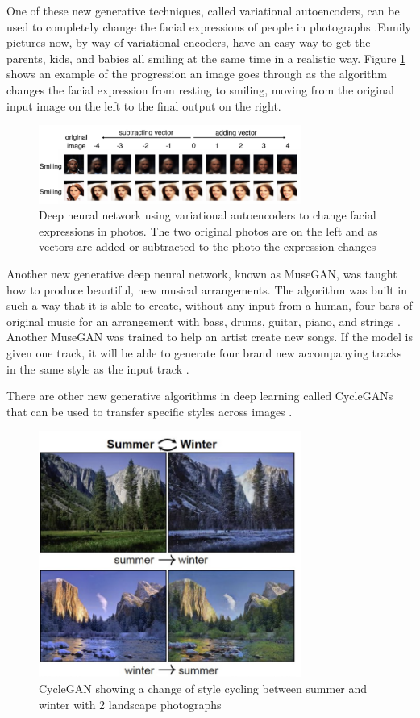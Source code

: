 \documentclass[5p,authoryear]{elsarticle}
\begin{document}
One of these new generative techniques, called variational autoencoders, can be used to completely change the facial expressions of people in photographs  \citep{VAEs}.Family pictures now, by way of variational encoders, have an easy way to get the parents, kids, and babies all smiling at the same time in a realistic way. Figure \ref{smile} shows an example of the progression an image goes through as the algorithm changes the facial expression from resting to smiling, moving from the original input image on the left to the final output on the right. 

\begin{figure}[!htb] \centering
	\includegraphics[width=3.4in]{figures/Smile_GAN.png}
	\caption[]{Deep neural network using variational autoencoders to change facial expressions in photos. The two original photos are on the left and as vectors are added or subtracted to the photo the expression changes} \label{smile} 
\end{figure}

Another new generative deep neural network, known as MuseGAN, was taught how to produce beautiful, new musical arrangements. The algorithm was built in such a way that it is able to create, without any input from a human, four bars of original music for an arrangement with bass, drums, guitar, piano, and strings \citep{MuseGAN}. Another MuseGAN was trained to help an artist create new songs. If the model is given one track, it will be able to generate four brand new accompanying tracks in the same style as the input track \citep{MuseGAN}.

There are other new generative algorithms in deep learning called CycleGANs that can be used to transfer specific styles across images \citep{CycleGAN}. 


\begin{figure}[!htb] \centering
	\includegraphics[width=3.4in]{figures/CycleGAN1.png}
	\caption[]{CycleGAN showing a change of style cycling between summer and winter with 2 landscape photographs} \label{summer} 
\end{figure}
\end{document}
